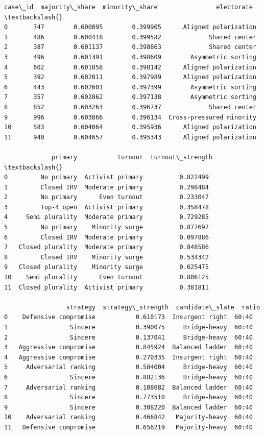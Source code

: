 \documentclass[11pt]{article}
\makeatletter
\newcommand{\boxspacing}{\kern\kvtcb@left@rule\kern\kvtcb@boxsep}
\newcommand{\prompt}[4]{
        {\ttfamily\llap{{\color{#2}[#3]:\hspace{3pt}#4}}\vspace{-\baselineskip}}
    }
\makeatother
\begin{document}
            \begin{tcolorbox}[breakable, size=fbox, boxrule=.5pt, pad at break*=1mm, opacityfill=0]
\prompt{Out}{outcolor}{100}{\boxspacing}
\begin{Verbatim}[commandchars=\\\{\}]
    case\_id  majority\_share  minority\_share                electorate  \textbackslash{}
0       747        0.600095        0.399905      Aligned polarization
1       486        0.600418        0.399582             Shared center
2       387        0.601137        0.398863             Shared center
3       496        0.601391        0.398609        Asymmetric sorting
4       602        0.601858        0.398142      Aligned polarization
5       392        0.602011        0.397989      Aligned polarization
6       443        0.602601        0.397399        Asymmetric sorting
7       357        0.602862        0.397138        Asymmetric sorting
8       852        0.603263        0.396737             Shared center
9       996        0.603866        0.396134  Cross-pressured minority
10      583        0.604064        0.395936      Aligned polarization
11      940        0.604657        0.395343      Aligned polarization

             primary           turnout  turnout\_strength  \textbackslash{}
0         No primary  Activist primary          0.822499
1         Closed IRV  Moderate primary          0.298484
2         No primary      Even turnout          0.233047
3         Top-4 open  Activist primary          0.358478
4     Semi plurality  Moderate primary          0.729285
5         No primary    Minority surge          0.877697
6         Closed IRV  Moderate primary          0.097886
7   Closed plurality  Moderate primary          0.848586
8         Closed IRV    Minority surge          0.534342
9   Closed plurality    Minority surge          0.625475
10    Semi plurality      Even turnout          0.806125
11  Closed plurality  Activist primary          0.381811

                 strategy  strategy\_strength  candidate\_slate  ratio
0    Defensive compromise           0.610173  Insurgent right  60:40
1                 Sincere           0.390075     Bridge-heavy  60:40
2                 Sincere           0.137041     Bridge-heavy  60:40
3   Aggressive compromise           0.845924  Balanced ladder  60:40
4   Aggressive compromise           0.270335  Insurgent right  60:40
5     Adversarial ranking           0.584004     Bridge-heavy  60:40
6                 Sincere           0.882136     Bridge-heavy  60:40
7     Adversarial ranking           0.108682  Balanced ladder  60:40
8                 Sincere           0.773510     Bridge-heavy  60:40
9                 Sincere           0.308220  Balanced ladder  60:40
10    Adversarial ranking           0.466842   Majority-heavy  60:40
11   Defensive compromise           0.656219   Majority-heavy  60:40
\end{Verbatim}
\end{tcolorbox}
        
\end{document}
